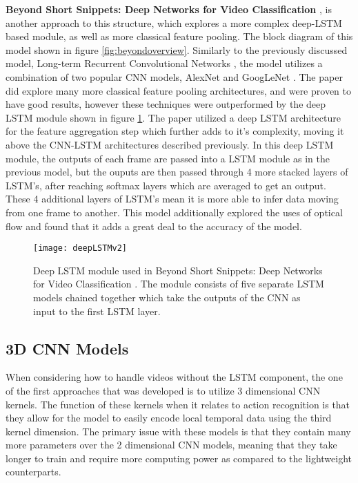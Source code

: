 \textbf{Beyond Short Snippets: Deep Networks for Video Classification} \cite{beyondshortsnippets}, is another approach to this structure, which explores a more complex deep-LSTM based module, as well as more classical feature pooling. The block diagram of this model shown in figure \ref{fig:beyondoverview}. Similarly to the previously discussed model, Long-term Recurrent Convolutional Networks \cite{LRCNS}, the model utilizes a combination of two popular CNN models, AlexNet \cite{alexnet} and GoogLeNet \cite{googlenet}. The paper did explore many more classical feature pooling architectures, and were proven to have good results, however these techniques were outperformed by the deep LSTM module shown in figure \ref{fig:deepLSTM}. The paper utilized a deep LSTM architecture for the feature aggregation step which further adds to it's complexity, moving it above the CNN-LSTM architectures described previously. In this deep LSTM module, the outputs of each frame are passed into a LSTM module as in the previous model, but the ouputs are then passed  through 4 more stacked layers of LSTM's, after reaching softmax layers which are averaged to get an output. These 4 additional layers of LSTM's mean it is more able to infer data moving from one frame to another. This model additionally explored the uses of optical flow and found that it adds a great deal to the accuracy of the model.

\begin{figure}[ht]
	\texttt{[image: deepLSTMv2]}
	\centering
	\caption{Deep LSTM module used in Beyond Short Snippets: Deep Networks for Video Classification \cite{beyondshortsnippets}. The module consists of five separate LSTM models chained together which take the outputs of the CNN as input to the first LSTM layer.}
	\label{fig:deepLSTM}
\end{figure}

\subsection{3D CNN Models}
\label{sec:3dCNNModels}

When considering how to handle videos without the LSTM component, the one of the first approaches that was developed is to utilize 3 dimensional CNN kernels. The function of these kernels when it relates to action recognition is that they allow for the model to easily encode local temporal data using the third kernel dimension. The primary issue with these models is that they contain many more parameters over the 2 dimensional CNN models, meaning that they take longer to train and require more computing power as compared to the lightweight counterparts.

